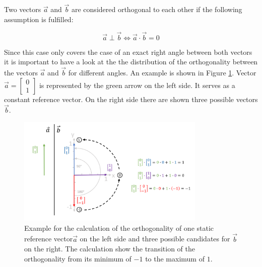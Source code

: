 Two vectors $\overrightarrow{a}$ and $\overrightarrow{b}$ are considered orthogonal to each other if the following assumption is fulfilled:

\begin{equation}
\overrightarrow{a} \perp  \overrightarrow{b} \Leftrightarrow  \overrightarrow{a} \cdot  \overrightarrow{b} = 0
\label{equation_orthogonality}
\end{equation}

Since this case only covers the case of an exact right angle between both vectors it is important to have a look at the the distribution of the orthogonality between the vectors $\overrightarrow{a}$ and $\overrightarrow{b}$ for different angles. An example is shown in Figure \ref{orthogonaltiy_figure}. Vector $\overrightarrow{a} = \begin{bmatrix} 0 \\ 1 \end{bmatrix}$ is represented by the green arrow on the left side. It serves as a constant reference vector. On the right side there are shown three possible vectors $\overrightarrow{b}$.

\begin{figure}[H]
    \centering
    \includegraphics[width=0.8\textwidth]{Graphics/orthogonality.png}
    \caption{Example for the calculation of the orthogonality of one static reference vector$\overrightarrow{a}$ on the left side and three possible candidates for $\overrightarrow{b}$ on the right. The calculation show the transition of the orthogonality from its minimum of $-1$ to the maximum of $1$.}
    \label{orthogonaltiy_figure}
\end{figure}

